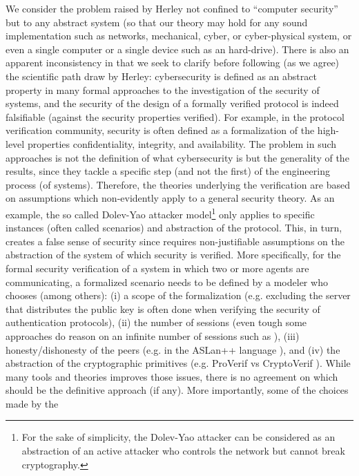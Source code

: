 \documentclass[conference]{IEEEtran}
\begin{document}
We consider the problem raised by Herley not confined to
``computer security'' but to any abstract system (so that our theory may hold
for any sound implementation such as networks, mechanical, cyber, or
cyber-physical system, or even a single computer or a single device such as an
hard-drive).  There is also an apparent inconsistency in
\cite{Herley2016unfalsifiability} that we seek to clarify before following (as
we agree) the scientific path draw by Herley: cybersecurity is defined as an
abstract property in many formal approaches to the investigation of the
security of systems, and the security of the design of a formally verified
protocol is indeed falsifiable (against the security properties verified).  For
example, in the protocol verification community, security is often defined as a
formalization of the high-level properties confidentiality, integrity, and
availability. The problem in such approaches is not the definition of what
cybersecurity is but the generality of the results, since they tackle a specific
step (and not the first) of the engineering process (of systems).  Therefore,
the theories underlying the verification are based on assumptions which
non-evidently apply to a general security theory.  As an example, the so called
Dolev-Yao attacker model\footnote{For the sake of simplicity, the Dolev-Yao
attacker can be considered as an abstraction of an active attacker who controls
the network but cannot break cryptography.} \cite{Dolev1983security} only
applies to specific instances (often called scenarios) and abstraction of the
protocol. This, in turn, creates a false sense of security since requires
non-justifiable assumptions on the abstraction of the system of which security
is verified. More specifically, for the formal security verification of a
system in which two or more agents are communicating, a formalized scenario
needs to be defined by a modeler who chooses (among others): (i) a scope of the
formalization (e.g.  excluding the server that distributes the public key is
often done when verifying the security of authentication protocols), (ii) the
number of sessions (even tough some approaches do reason on an infinite number
of sessions such as \cite{Escobar2007maudenpa}), (iii) honesty/dishonesty of
the peers (e.g.  in the ASLan++ language \cite{Oheimb2010aslan++}), and (iv)
the abstraction of the cryptographic primitives (e.g.  ProVerif vs CryptoVerif
\cite{Blanchet2017symbolic}).  While many tools and theories improves those 
issues, there is no agreement on which should be the definitive
approach (if any). More importantly, some of the choices made by the
\end{document}
